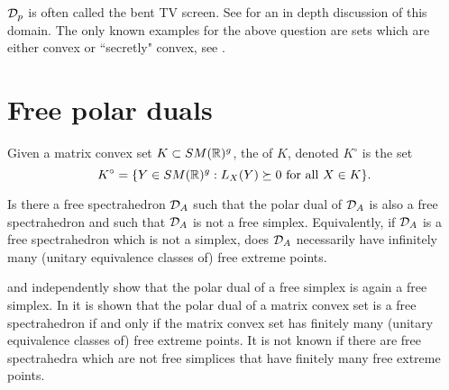 $\mathcal{D}_p$ is often called the bent TV screen. See \cite[Section 7.3]{EHKM18} for an in depth discussion of this domain. The only known examples 
for the above question are sets which are either convex or ``secretly" convex, see \cite{HKM16}.



\section{Free polar duals}

Given a matrix convex set $K \subset SM(\mathbb{R})^g$, the  of $K$, denoted $K^\circ$ is the set
\[
K^\circ = \{ Y \in SM(\mathbb{R})^g : L_X (Y) \succeq 0 \mathrm{\ for\ all\ } X \in K\}. 
\]

\begin{question}
Is there a free spectrahedron $\mathcal{D}_A$ such that the polar dual of $\mathcal{D}_A$ is also a free spectrahedron and such that $\mathcal{D}_A$ is not a free 
simplex. Equivalently, if $\mathcal{D}_A$ is a free spectrahedron which is not a simplex, does $\mathcal{D}_A$ necessarily have infinitely many (unitary 
equivalence classes of) free extreme points.
\end{question}

\cite[Corollary 6.8]{EHKM18} and \cite[Theorem 4.7]{FNT17} independently show that the polar dual of a free simplex is again a free simplex. 
In \cite{EHKM18} it is shown that the polar dual of a matrix convex set is a free spectrahedron if and only if the matrix convex set has 
finitely many (unitary equivalence classes of) free extreme points. It is not known if there are free spectrahedra which are not free 
simplices that have finitely many free extreme points. 


